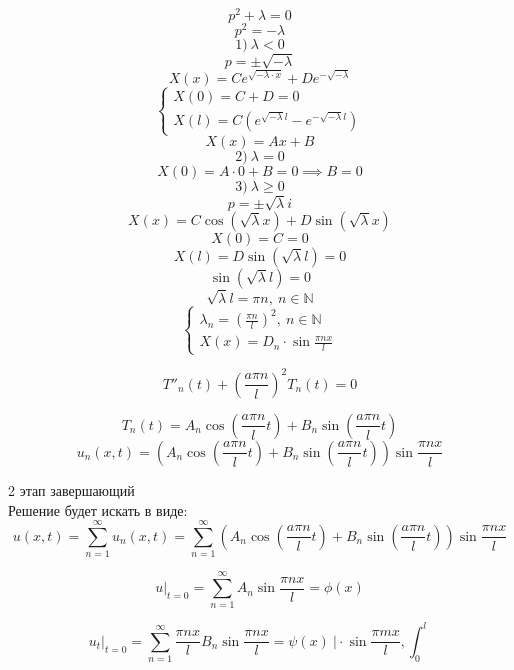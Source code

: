 \documentclass[a4paper]{article}
\begin{document}
\[
    p^2 + \lambda = 0
\]
\[
    p^2 = -\lambda
\]
\[
    1) \ \lambda < 0
\]
\[
    p = \pm \sqrt{-\lambda} 
\]
\[
    X(x) = C e^{\sqrt{-\lambda \cdot x}} + D e^{-\sqrt{-\lambda } }
\]
\[
    \begin{cases}
        X(0) = C + D = 0\\
        X(l) = C(e^{\sqrt{-\lambda}l } - e^{-\sqrt{-\lambda} l})
    \end{cases}
\]
\[
    X(x) = Ax + B
\]
\[
    2) \ \lambda = 0
\]
\[
    X(0) = A \cdot 0 + B = 0 \implies B = 0
\]
\[
    3) \ \lambda \ge 0
\]
\[
    p = \pm \sqrt{\lambda} i
\]
\[
    X(x) = C \cos(\sqrt{\lambda} x) + D \sin(\sqrt{\lambda} x)  
\]
\[
    X(0) = C = 0
\]
\[
    X(l) = D\sin(\sqrt{\lambda} l) = 0
\]
\[
    \sin(\sqrt{\lambda} l) = 0
\]
\[
    \sqrt{\lambda} l = \pi n, \ n \in \mathbb{N}
\]
\begin{equation}
    \begin{cases}
        \lambda_n = (\frac{\pi n}{l})^2, \ n \in \mathbb{N}\\
        X(x) = D_n \cdot \sin \frac{\pi n x}{l} 
    \end{cases}
\end{equation}

\[
    T''_n(t) + \left(\frac{a \pi n}{l}\right)^2 T_n(t) = 0
\]

\[
    T_n(t) = A_n \cos\left(\frac{a \pi n}{l} t\right) + B_n \sin\left(\frac{a \pi n}{l} t\right)
\]
\begin{equation}
    u_n(x,t) = \left(A_n \cos\left(\frac{a \pi n}{l} t\right) + B_n \sin\left(\frac{a \pi n}{l} t\right)
    \right) \sin \frac{\pi n x}{l} 
\end{equation}

2 этап завершающий\\
Решение будет искать в виде:
\[
    u(x,t) = \sum_{n=1}^{\infty} u_n(x,t) = \sum_{n=1}^{\infty} \left(A_n 
    \cos\left(\frac{a \pi n}{l} t\right) + B_n \sin\left(\frac{a \pi n}{l} 
    t\right) \right) \sin \frac{\pi n x}{l}
\]

\begin{equation}
   u |_{t=0} = \sum_{n=1}^{\infty} A_n \sin \frac{\pi n x}{l} = \phi(x)
\end{equation}

\begin{equation}
    u_t |_{t=0} = \sum_{n=1}^{\infty} \frac{\pi n x}{l}
    B_n \sin \frac{\pi n x}{l} = \psi(x) \  \big| \cdot \sin \frac{\pi m x}{l}, \int_{0}^{l} 
\end{equation}
\end{document}
